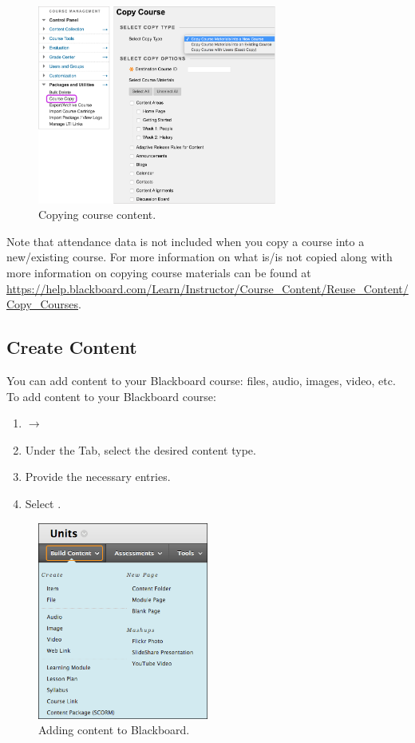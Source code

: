 	\begin{figure}[!ht]
	\centering
	\includegraphics[width=0.7\textwidth]{sections/blackboard/images/original_copy_course.png}
	\caption{Copying course content.}
	\end{figure}

Note that attendance data is not included when you copy a course into a new/existing course. For more information on what is/is not copied along with more information on copying course materials can be found at \url{https://help.blackboard.com/Learn/Instructor/Course_Content/Reuse_Content/Copy_Courses}. 



\subsection{Create Content}

You can add content to your Blackboard course: files, audio, images, video, etc. To add content to your Blackboard course:

	\begin{enumerate}[1.]
	\item {} $\to$ 
	\item Under the  Tab, select the desired content type.
	\item Provide the necessary entries.
	\item Select .
	\end{enumerate}

	\begin{figure}[!ht]
	\centering
	\includegraphics[width=0.5\textwidth]{sections/blackboard/images/build_content_drop_down_list.png}
	\caption{Adding content to Blackboard.}
	\end{figure}

